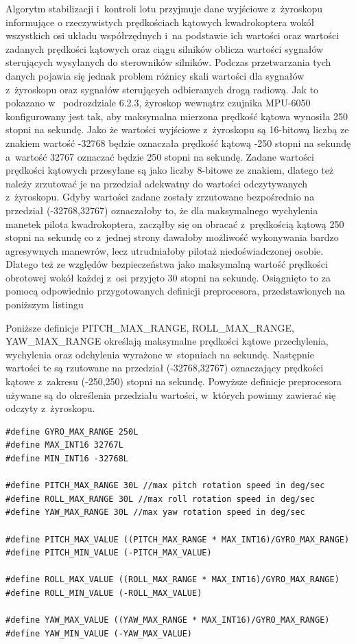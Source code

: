 Algorytm stabilizacji i~kontroli lotu przyjmuje dane wyjściowe z~żyroskopu informujące o rzeczywistych prędkościach kątowych kwadrokoptera wokół wszystkich osi układu współrzędnych i~na podstawie ich wartości oraz wartości zadanych prędkości kątowych oraz ciągu silników oblicza wartości sygnałów sterujących wysyłanych do sterowników silników. Podczas przetwarzania tych danych pojawia się jednak problem różnicy skali wartości dla sygnałów z~żyroskopu oraz sygnałów sterujących odbieranych drogą radiową. Jak to pokazano w~ podrozdziale 6.2.3, żyroskop wewnątrz czujnika MPU-6050 konfigurowany jest tak, aby maksymalna mierzona prędkość kątowa wynosiła 250 stopni na sekundę. Jako że wartości wyjściowe z~żyroskopu są 16-bitową liczbą ze znakiem wartość -32768 będzie oznaczała prędkość kątową -250 stopni na sekundę a~wartość 32767 oznaczać będzie 250 stopni na sekundę. Zadane wartości prędkości kątowych przesyłane są jako liczby 8-bitowe ze znakiem, dlatego też należy zrzutować je na przedział adekwatny do wartości odczytywanych z~żyroskopu. Gdyby wartości zadane zostały zrzutowane bezpośrednio na przedział (-32768,32767) oznaczałoby to, że dla maksymalnego wychylenia manetek pilota kwadrokoptera, zacząłby się on obracać z~prędkością kątową 250 stopni na sekundę co z~jednej strony dawałoby możliwość wykonywania bardzo agresywnych manewrów, lecz utrudniałoby pilotaż niedoświadczonej osobie. Dlatego też ze względów bezpieczeństwa jako maksymalną wartość prędkości obrotowej wokół każdej z~osi przyjęto 30 stopni na sekundę. Osiągnięto to za pomocą odpowiednio przygotowanych definicji preprocesora, przedstawionych na poniższym listingu


Poniższe definicje PITCH\_MAX\_RANGE, ROLL\_MAX\_RANGE, YAW\_MAX\_RANGE określają maksymalne prędkości kątowe przechylenia, wychylenia oraz odchylenia wyrażone w~stopniach na sekundę. Następnie wartości te są rzutowane na przedział (-32768,32767) oznaczający prędkości kątowe z~zakresu (-250,250) stopni na sekundę. Powyższe definicje preprocesora używane są do określenia przedziału wartości, w~których powinny zawierać się odczyty z~żyroskopu.

\begin{lstlisting}
#define GYRO_MAX_RANGE 250L
#define MAX_INT16 32767L
#define MIN_INT16 -32768L

#define PITCH_MAX_RANGE 30L //max pitch rotation speed in deg/sec
#define ROLL_MAX_RANGE 30L //max roll rotation speed in deg/sec
#define YAW_MAX_RANGE 30L //max yaw rotation speed in deg/sec

#define PITCH_MAX_VALUE ((PITCH_MAX_RANGE * MAX_INT16)/GYRO_MAX_RANGE)
#define PITCH_MIN_VALUE (-PITCH_MAX_VALUE)

#define ROLL_MAX_VALUE ((ROLL_MAX_RANGE * MAX_INT16)/GYRO_MAX_RANGE)
#define ROLL_MIN_VALUE (-ROLL_MAX_VALUE)

#define YAW_MAX_VALUE ((YAW_MAX_RANGE * MAX_INT16)/GYRO_MAX_RANGE)
#define YAW_MIN_VALUE (-YAW_MAX_VALUE)
\end{lstlisting}


